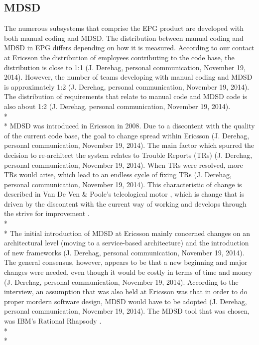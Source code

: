 \documentclass[final_report_innit.tex]{subfiles}
\begin{document}
\subsection{MDSD}
The numerous subsystems that comprise the EPG product are developed with both manual coding and MDSD. The distribution between manual coding and MDSD in EPG differs depending on how it is measured. According to our contact at Ericsson the distribution of employees contributing to the code base, the distribution is close to 1:1 (J. Derehag, personal communication, November 19, 2014). However, the number of teams developing with manual coding and MDSD is approximately 1:2 (J. Derehag, personal communication, November 19, 2014). The distribution of requirements that relate to manual code and MDSD code is also about 1:2 (J. Derehag, personal communication, November 19, 2014).
\\* 
\\* 
MDSD was introduced in Ericsson in 2008. Due to a discontent with the quality of the current code base, the goal to change spread within Ericsson (J. Derehag, personal communication, November 19, 2014). The main factor which spurred the decision to re-architect the system relates to Trouble Reports (TRs) (J. Derehag, personal communication, November 19, 2014). When TRs were resolved, more TRs would arise, which lead to an endless cycle of fixing TRs (J. Derehag, personal communication, November 19, 2014). This characteristic of change is described in Van De Ven \& Poole’s teleological motor \cite{van1995explaining}, which is change that is driven by the discontent with the current way of working and develops through the strive for improvement \cite{van1995explaining}. 
\\* 
\\* 
The initial introduction of MDSD at Ericsson mainly concerned changes on an architectural level (moving to a service-based architecture) and the introduction of new frameworks (J. Derehag, personal communication, November 19, 2014). The general consensus, however, appears to be that a new beginning and major changes were needed, even though it would be costly in terms of time and money (J. Derehag, personal communication, November 19, 2014). According to the interview, an assumption that was also held at Ericsson was that in order to do proper mordern software design, MDSD would have to be adopted (J. Derehag, personal communication, November 19, 2014). The MDSD tool that was chosen, was IBM’s Rational Rhapsody \cite{rrf}.
\\* 
\\* 
\end{document}
